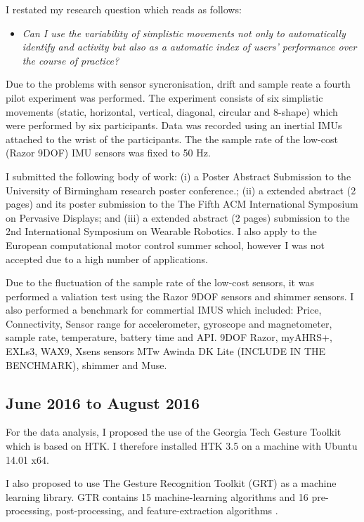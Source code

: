 \documentclass[10pt,journal,onecolumn,compsoc]{IEEEtran}
\begin{document}
I restated my research question which reads as follows:
\begin{itemize}
 \item \textit{Can I use the variability of simplistic movements not only to automatically identify
and activity but also as a automatic index of users' performance over the course of practice?}
\end{itemize}

Due to the problems with sensor syncronisation, drift and sample reate a fourth pilot experiment
was performed. The experiment consists of six simplistic movements 
(static, horizontal, vertical, diagonal, circular and 8-shape)
which were performed by six participants. 
Data was recorded using 
an inertial IMUs attached to the wrist of the participants.
The the sample rate of the low-cost (Razor 9DOF) IMU sensors 
was fixed to 50 Hz.

I submitted the following body of work:
(i) a Poster Abstract Submission to the University of Birmingham research poster conference.;
(ii) a extended abstract (2 pages)  and its poster submission to the The Fifth ACM International 
Symposium on Pervasive Displays; and
(iii) a extended abstract (2 pages) submission to the 2nd International Symposium on Wearable Robotics.
I also apply to the European computational motor control summer school,
however I was not accepted due to a high number of applications.

Due to the fluctuation of the sample rate of the low-cost sensors,
it was performed a valiation test using the Razor 9DOF sensors and shimmer sensors.
I also performed a benchmark for commertial IMUS which included:
Price, Connectivity, Sensor range for accelerometer, gyroscope and magnetometer, 
sample rate, temperature, battery time and API.
9DOF Razor, myAHRS+, EXLs3, WAX9,
Xsens sensors MTw Awinda DK Lite (INCLUDE IN THE BENCHMARK),
shimmer and Muse.





\subsection{June 2016 to August 2016}

For the data analysis, I proposed the use of the Georgia Tech Gesture Toolkit which is based on HTK.
I therefore installed HTK 3.5 on a machine with Ubuntu 14.01 x64.

I also proposed to use The Gesture Recognition Toolkit (GRT) as a machine learning library.
GTR contains 15 machine-learning algorithms and 16 pre-processing, post-processing, and feature-extraction algorithms 
\cite{Gillian2014}.
\end{document}
